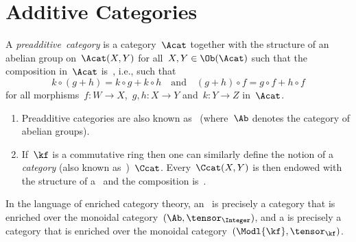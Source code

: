 \section{Additive Categories}


\begin{definition}
  A \emph{preadditive~category} is a category~$\Acat$ together with the structure of an abelian group on~$\Acat(X,Y)$ for all~$X, Y \in \Ob(\Acat)$ such that the composition in~$\Acat$ is~{\Zbilin}, i.e., such that
  \[
    k \circ (g + h) = k \circ g + k \circ h
    \quad\text{and}\quad
    (g + h) \circ f = g \circ f + h \circ f
  \]
  for all morphisms~$f \colon W \to X$,~$g, h \colon X \to Y$ and~$k \colon Y \to Z$ in~$\Acat$.
\end{definition}


\begin{remark}
  \leavevmode
  \begin{enumerate}
    \item
      Preadditive categories are also known as~\emph{} (where~$\Ab$ denotes the category of abelian groups).
    \item
      If~$\kf$ is a commutative ring then one can similarly define the notion of a \emph{{\preklin} category} (also known as~\emph{})~$\Ccat$.
      Every~$\Ccat(X,Y)$ is then endowed with the structure of a~{\module{$\kf$}} and the composition is~{\kbilin}.
  \end{enumerate}
\end{remark}


\begin{remark*}
  In the language of enriched category theory, an~ is precisely a category that is enriched over the monoidal category~$(\Ab,{\tensor_\Integer})$, and a  is precisely a category that is enriched over the monoidal category~$(\Modl{\kf}, {\tensor_\kf})$.
\end{remark*}


